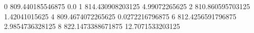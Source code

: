 0 809.440185546875 0.0
1 814.430908203125 4.99072265625
2 810.860595703125 1.42041015625
4 809.4674072265625 0.0272216796875
6 812.4256591796875 2.9854736328125
8 822.1473388671875 12.7071533203125
